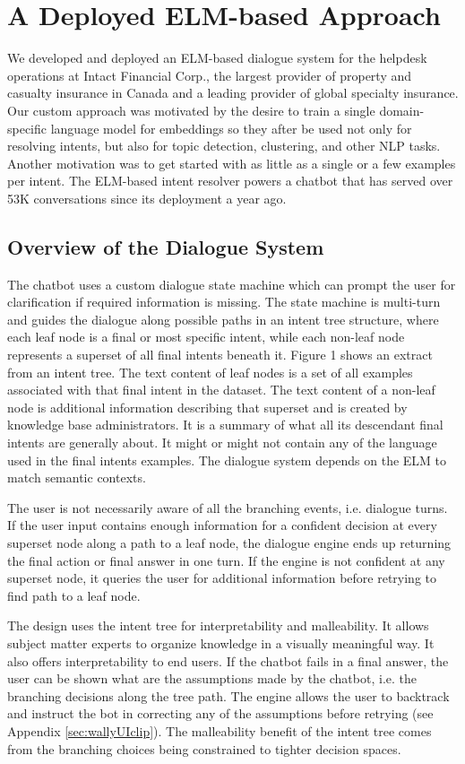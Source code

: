\documentclass[sigconf, anonymous=true]{acmart}
\begin{document}
\section{A Deployed ELM-based Approach}
We developed and deployed an ELM-based dialogue system for the helpdesk operations at Intact Financial Corp., the largest provider of property and casualty insurance in Canada and a leading provider of global specialty insurance. Our custom approach was motivated by the desire to train a single domain-specific language model for embeddings so they after be used not only for resolving intents, but also for topic detection, clustering, and other NLP tasks. Another motivation was to get started with as little as a single or a few examples per intent. The ELM-based intent resolver powers a chatbot that has served over 53K conversations since its deployment a year ago.

\subsection{Overview of the Dialogue System}
\label{chabotOverview}
The chatbot uses a custom dialogue state machine which can prompt the user for clarification if required information is missing. The state machine is multi-turn and guides the dialogue along possible paths in an intent tree structure, where each leaf node is a final or most specific intent, while each non-leaf node represents a superset of all final intents beneath it. Figure 1 shows an extract from an intent tree. The text content of leaf nodes is a set of all examples associated with that final intent in the dataset. The text content of a non-leaf node is additional information describing that superset and is created by knowledge base administrators. It is a summary of what all its descendant final intents are generally about. It might or might not contain any of the language used in the final intents examples. The dialogue system depends on the ELM to match semantic contexts. 

The user is not necessarily aware of all the branching events, i.e. dialogue turns. If the user input contains enough information for a confident decision at every superset node along a path to a leaf node, the dialogue engine ends up returning the final action or final answer in one turn. If the engine is not confident at any superset node, it queries the user for additional information before retrying to find path to a leaf node. 

The design uses the intent tree for interpretability and malleability. It allows subject matter experts to organize knowledge in a visually meaningful way. It also offers interpretability to end users. If the chatbot fails in a final answer, the user can be shown what are the assumptions made by the chatbot, i.e. the branching decisions along the tree path. The engine allows the user to backtrack and instruct the bot in correcting any of the assumptions before retrying (see Appendix \ref{sec:wallyUIclip}). The malleability benefit of the intent tree comes from the branching choices being constrained to tighter decision spaces. 
 
\end{document}
